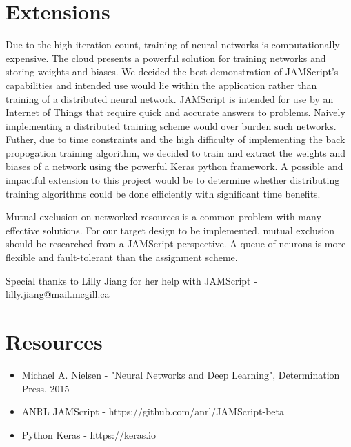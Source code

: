 \documentclass{article}
\begin{document}
\section{Extensions}
\begin{multicols}{2}
	Due to the high iteration count, training of neural networks is computationally expensive. The cloud presents a powerful solution for training networks and storing weights and biases. We decided the best demonstration of JAMScript’s capabilities and intended use would lie within the application rather than training of a distributed neural network. JAMScript is intended for use by an Internet of Things that require quick and accurate answers to problems. Naively implementing a distributed training scheme would over burden such networks. Futher, due to time constraints and the high difficulty of implementing the back propogation training algorithm, we decided to train and extract the weights and biases of a network using the powerful Keras python framework. A possible and impactful extension to this project would be to determine whether distributing training algorithms could be done efficiently with significant time benefits. 
\par
	Mutual exclusion on networked resources is a common problem with many effective solutions. For our target design to be implemented, mutual exclusion should be researched from a JAMScript perspective. A queue of neurons is more flexible and fault-tolerant than the assignment scheme.
\end{multicols}

\begin {center}
Special thanks to Lilly Jiang for her help with JAMScript - lilly.jiang@mail.mcgill.ca
\end{center}

\section{Resources}
\begin{itemize}
	\item Michael A. Nielsen - "Neural Networks and Deep Learning", Determination Press, 2015
	\item ANRL JAMScript - https://github.com/anrl/JAMScript-beta
	\item Python Keras - https://keras.io
\end{itemize}
\end{document}
